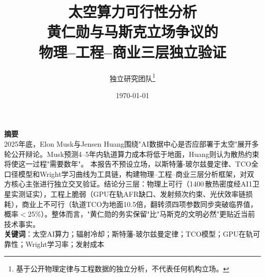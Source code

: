 \documentclass[12pt,a4paper]{article}
\title{{\Huge\bfseries 太空算力可行性分析}\\[0.5em]
       {\large\mdseries 黄仁勋与马斯克立场争议的\\[0.2em]物理--工程--商业三层独立验证}}
\author{独立研究团队\thanks{基于公开物理定律与工程数据的独立分析，不代表任何机构立场。}}
\date{\today}
\begin{document}
\maketitle
\thispagestyle{empty}

\vspace{2em}
\begin{center}
\begin{minipage}{0.85\textwidth}
\centering
\textbf{摘要} \\[0.5em]
2025年底，Elon Musk与Jensen Huang围绕"AI数据中心是否应部署于太空"展开多轮公开辩论。Musk预测4--5年内轨道算力成本将低于地面，Huang则认为散热约束将使这一过程"需要数年"。
本报告不预设立场，以斯特藩-玻尔兹曼定律、TCO全口径模型和Wright学习曲线为工具链，构建物理--工程--商业三层分析框架，对双方核心主张进行独立交叉验证。结论分三层：物理上可行（1400\,\unitWpm{}散热密度经AI1卫星实测证实），工程上脆弱（GPU在轨AFR缺口、发射频次约束、光伏效率链损耗），商业上不可行（轨道TCO为地面10.5倍，翻转须四项参数同步突破临界值，概率$<$25\%）。整体而言，"黄仁勋的务实保留"比"马斯克的文明必然"更贴近当前技术事实。
\\[1em]
\noindent\textbf{关键词}：太空AI算力；辐射冷却；斯特藩-玻尔兹曼定律；TCO模型；GPU在轨可靠性；Wright学习率；发射成本
\end{minipage}
\end{center}

\newpage

\setcounter{tocdepth}{2}
\tableofcontents
\newpage


\newpage


\newpage


\newpage


\newpage


\newpage

\printbibliography[title={参考文献}]
\end{document}
